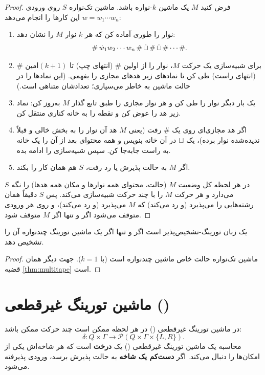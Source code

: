 \begin{proof}
فرض کنید $M$ یک ماشین $k$-نواره باشد. ماشین تک‌نواره $S$ روی ورودی $w=w_1\cdots w_n$ این کارها را انجام می‌دهد:
\begin{enumerate}
\item نوار را طوری آماده کن که هر $k$ نوار $M$ را نشان دهد:
\[\#\,\dot w_1w_2\cdots w_n\,\#\,\dot{\sqcup}\,\#\,\dot{\sqcup}\,\#\cdots\#.\]
\item برای شبیه‌سازی یک حرکت $M$، نوار را از اولین $\#$ (انتهای چپ) تا $(k+1)$امین $\#$ (انتهای راست) طی کن تا نمادهای زیر هدهای مجازی را بفهمی. (این نمادها را در حالت ماشین به خاطر می‌سپاری؛ تعدادشان متناهی است.)
\item یک بار دیگر نوار را طی کن و هر نوار مجازی را طبق تابع گذار $M$ به‌روز کن: نماد زیر هد را عوض کن و نقطه را به خانه کناری منتقل کن.
\item اگر هد مجازی‌ای روی یک $\#$ رفت (یعنی $M$ هد آن نوار را به بخش خالی و قبلاً ندیده‌شده نوار برده)، یک $\sqcup$ در آن خانه بنویس و همه محتوای بعد از آن را یک خانه به راست جابه‌جا کن. سپس شبیه‌سازی را ادامه بده.
\item اگر $M$ به حالت پذیرش یا رد رفت، $S$ هم همان کار را بکند.
\end{enumerate}
$S$ در هر لحظه کل وضعیت $M$ (حالت، محتوای همه نوارها و مکان همه هدها) را نگه می‌دارد و هر حرکت $M$ را با چند حرکت شبیه‌سازی می‌کند. پس $S$ دقیقاً همان رشته‌هایی را می‌پذیرد (و رد می‌کند) که $M$ می‌پذیرد (و رد می‌کند)، و روی هر ورودی متوقف می‌شود اگر و تنها اگر $M$ متوقف شود.
\end{proof}

\begin{corollary}
یک زبان تورینگ-تشخیص‌پذیر است اگر و تنها اگر یک ماشین تورینگ چندنواره آن را تشخیص دهد.
\end{corollary}
\begin{proof}
ماشین تک‌نواره حالت خاص ماشین چندنواره است (با $k=1$). جهت دیگر همان قضیه \ref{thm:multitape} است.
\end{proof}

\section{ماشین تورینگ غیرقطعی ()}

در ماشین تورینگ غیرقطعی () در هر لحظه ممکن است چند حرکت ممکن باشد:
\[\delta:Q\times\Gamma\to\mathcal{P}(Q\times\Gamma\times\{L,R\}).\]
محاسبه یک ماشین تورینگ غیرقطعی () یک \textbf{درخت} است که هر شاخه‌اش یکی از امکان‌ها را دنبال می‌کند. اگر \textbf{دست‌کم یک شاخه} به حالت پذیرش برسد، ورودی پذیرفته می‌شود.

